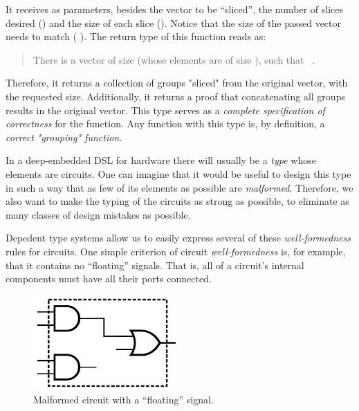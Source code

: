     \begin{listing}[h]
    \end{listing}

    It receives as parameters, besides the vector to be ``sliced'',
    the number of slices desired () and the size of each slice ().
    Notice that the size of the passed vector needs to match ( \AF{*} ).
    The return type of this function reads as:
    \begin{quote}
        There is a vector  of size 
        (whose elements are of size ), such that \texttt{   }.
    \end{quote}

    Therefore, it returns a collection of groups "sliced" from the original vector, with the requested size.
    Additionally, it returns a proof that concatenating all groups results in the original vector.
    This type serves as a \emph{complete specification of correctness} for the function.
    Any function with this type is, by definition, a \emph{correct "grouping" function}.

    In a deep-embedded \acs{DSL} for hardware there will usually be a \emph{type} whose elements are circuits.
    One can imagine that it would be useful to design this type
    in such a way that as few of its elements as possible are \emph{malformed}.
    Therefore, we also want to make the typing of the circuits as strong as possible,
    to eliminate as many classes of design mistakes as possible.


    Depedent type systems allow us to easily express several of these \emph{well-formedness} rules for circuits.
    One simple criterion of circuit \emph{well-formedness} is, for example, that it contains no ``floating'' signals.
    That is, all of a circuit's internal components must have all their ports connected.

    \begin{figure}[h]
        \centerline{\includegraphics[width=0.5\textwidth]{imgs/floating-wire.pdf}}
        \caption{Malformed circuit with a ``floating'' signal. \label{fig:floating-wire}}
    \end{figure}

